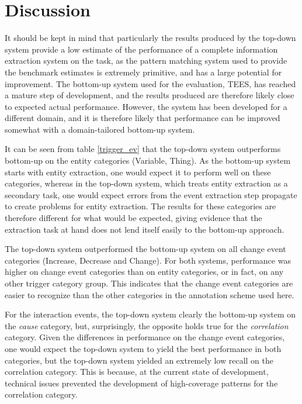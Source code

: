 \section{Discussion}

It should be kept in mind that particularly the results produced by the top-down system provide a low estimate of the performance of a complete information extraction system on the task, as the pattern matching system used to provide the benchmark estimates is extremely primitive, and has a large potential for improvement. The bottom-up system used for the evaluation, TEES, has reached a mature step of development, and the results produced are therefore likely close to expected actual performance. However, the system has been developed for a different domain, and it is therefore likely that performance can be improved somewhat with a domain-tailored bottom-up system.


It can be seen from table \ref{trigger_ev} that the top-down system outperforms bottom-up on the entity categories (Variable, Thing). As the bottom-up system starts with entity extraction, one would expect it to perform well on these categories, whereas in the top-down system, which treats entity extraction as a secondary task, one would expect errors from the event extraction step propagate to create problems for entity extraction. The results for these categories are therefore different for what would be expected, giving evidence that the extraction task at hand does not lend itself easily to the bottom-up approach. 

The top-down system outperformed the bottom-up system on all change event categories (Increase, Decrease and Change). For both systems, performance was higher on change event categories than on entity categories, or in fact, on any other trigger category group. This indicates that the change event categories are easier to recognize than the other categories in the annotation scheme used here.

For the interaction events, the top-down system clearly the bottom-up system on the \emph{cause} category, but, surprisingly, the opposite holds true for the \emph{correlation} category. Given the differences in performance on the change event categories, one would expect the top-down system to yield the best performance in both categories, but the top-down system yielded an extremely low recall on the correlation category. This is because, at the current state of development, technical issues prevented the development of high-coverage patterns for the correlation category. 


